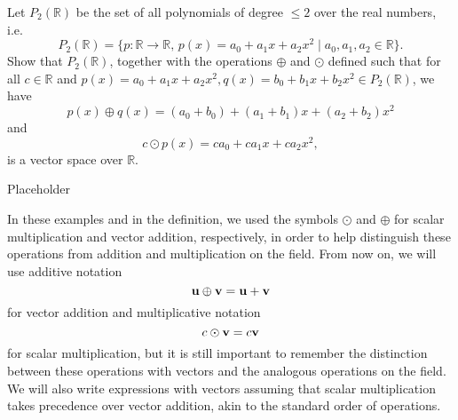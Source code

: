 \begin{exmp}
Let $ P_2(\mathbb{R}) $ be the set of all polynomials of degree $ \leq 2 $ over the real numbers, i.e.
\begin{equation*}
    P_2(\mathbb{R})=\{p:\mathbb{R}\to\mathbb{R},\,p(x)=a_0+a_1x+a_2x^2\mid a_0,a_1,a_2\in\mathbb{R}\}.
\end{equation*}
Show that $ P_2(\mathbb{R}) $, together with the operations $ \oplus $ and $ \odot $ defined such that for all $ c\in\mathbb{R} $ and $ p(x)=a_0+a_1x+a_2x^2,q(x)=b_0+b_1x+b_2x^2\in P_2(\mathbb{R}) $, we have
\begin{equation*}
    p(x)\oplus q(x)=(a_0+b_0)+(a_1+b_1)x+(a_2+b_2)x^2
\end{equation*}
and
\begin{equation*}
    c\odot p(x)=ca_0+ca_1x+ca_2x^2,
\end{equation*}
is a vector space over $ \mathbb{R} $.
\end{exmp}
\begin{sltn}
Placeholder
\end{sltn}

In these examples and in the definition, we used the symbols $ \odot $ and $ \oplus $ for scalar multiplication and vector addition, respectively, in order to help distinguish these operations from addition and multiplication on the field. From now on, we will use additive notation
\begin{equation*}
    \boldsymbol{\mathbf{u}}\oplus\boldsymbol{\mathbf{v}}=\boldsymbol{\mathbf{u}}+\boldsymbol{\mathbf{v}}
\end{equation*}
for vector addition and multiplicative notation
\begin{equation*}
    c\odot\boldsymbol{\mathbf{v}}=c\boldsymbol{\mathbf{v}}
\end{equation*}
for scalar multiplication, but it is still important to remember the distinction between these operations with vectors and the analogous operations on the field. We will also write expressions with vectors assuming that scalar multiplication takes precedence over vector addition, akin to the standard order of operations.

